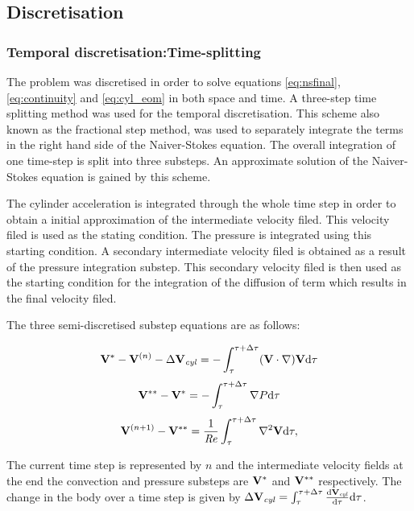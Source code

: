     
 \subsection{Discretisation}
 
 \subsubsection{Temporal discretisation:Time-splitting}
 
 The problem was discretised in order to solve equations \ref{eq:nsfinal}, \ref{eq:continuity} and \ref{eq:cyl_eom} in both space and time. A three-step time splitting method was used for the temporal discretisation. This scheme also known as the fractional step method, was used to separately integrate the terms in the right hand side of the Naiver-Stokes equation. The overall integration of one time-step is split into three substeps. An approximate solution of the Naiver-Stokes equation is gained by this scheme. 
 
 The cylinder acceleration is integrated through the whole time step in order to obtain a initial approximation of the intermediate velocity filed. This velocity filed is used as the stating condition. The pressure is integrated using this starting condition.  A secondary intermediate velocity filed is obtained as a result of the pressure integration substep. This secondary velocity filed is then used as the starting condition for the integration of the diffusion of term which results in the final velocity filed. 
 
 The three semi-discretised substep equations are as follows:
 
\begin{equation} \centering
\label{eq:substep1}
\Vint - \Vn - \Delta\Vcyl = -\int_{\tau}^{\tau+\Delta\tau}(\vecV\cdot\nabla)\vecV \mathrm{d}\tau
\end{equation}
\begin{equation} \centering
\label{eq:substep2}
\Vintint - \Vint = -\int_{\tau}^{\tau+\Delta\tau}\nabla\Pres \mathrm{d}\tau
\end{equation}
\begin{equation} \centering
\label{eq:substep3}
\Vnext-\Vintint = \frac{1}{\Rey}\int_{\tau}^{\tau+\Delta\tau}\gradsq{\vecV} \mathrm{d}\tau,
\end{equation} 
 
The current time step is represented by $n$ and the intermediate velocity fields at the end the convection and pressure substeps are $\mathbf{V}^{*}$ and $\mathbf{V}^{**}$ respectively. The change in the body over a time step is given by $\Delta\mathbf{V}_{\mathit{cyl}} =
\int_{\tau}^{\tau+\Delta\tau}\frac{\mathrm{d}\mathbf{V}_{\mathit{cyl}}}{\mathrm{d}\tau} \mathrm{d}\tau$. 

